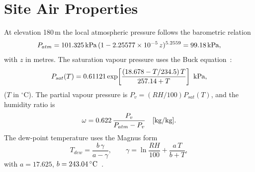 \documentclass[12pt,a4paper]{report}
\newcommand{\si}[1]{\mbox{#1}}
\newcommand{\SI}[2]{#1\,\mbox{#2}}
\newcommand{\per}{/}
\newcommand{\meter}{m}\newcommand{\metre}{m}
\newcommand{\kilo}{k}\newcommand{\centi}{c}\newcommand{\milli}{m}
\newcommand{\degreeCelsius}{\ensuremath{^{\circ}}C}
\newcommand{\degC}{\si{\degreeCelsius}}
\begin{document}
\section{Site Air Properties}
At elevation \SI{180}{\meter} the local atmospheric pressure follows the
barometric relation
\begin{equation}
  P_{atm} = \SI{101.325}{\kilo\pascal}\,(1 - 2.25577\times10^{-5}\,z)^{5.2559}
          = \SI{99.18}{\kilo\pascal},
  \label{eq:patm}
\end{equation}
with $z$ in metres. The saturation vapour pressure uses the Buck
equation~\cite{zhou2020review}:
\begin{equation}
  P_{sat}(T)=0.61121\exp\!\left[\frac{(18.678-T/234.5)\,T}{257.14+T}\right]\ \si{\kilo\pascal},
  \label{eq:buck}
\end{equation}
($T$ in \degC). The partial vapour pressure is $P_v=(RH/100)P_{sat}(T)$, and the
humidity ratio is
\begin{equation}
  \omega = 0.622\,\frac{P_v}{P_{atm}-P_v}\quad[\si{\kg\per\kg}].
  \label{eq:omega}
\end{equation}
The dew-point temperature uses the Magnus form
\begin{equation}
  T_{dew}=\frac{b\,\gamma}{a-\gamma},\qquad
  \gamma=\ln\!\frac{RH}{100}+\frac{a\,T}{b+T},
  \label{eq:dew}
\end{equation}
with $a=17.625$, $b=\SI{243.04}{\degreeCelsius}$~\cite{feng2022review}.
\end{document}
